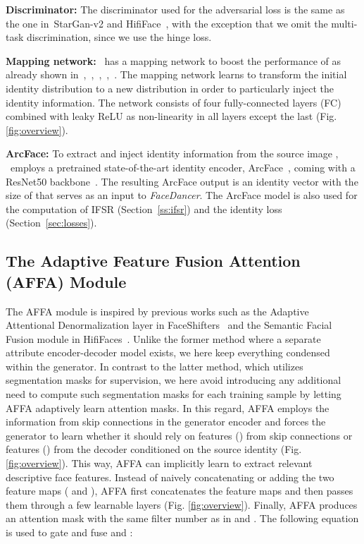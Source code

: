 \documentclass[10pt,twocolumn,letterpaper]{article}
\newcommand{\fti}[1]{\textit{FaceDancer}{#1}}
\begin{document}
\textbf{Discriminator:} The discriminator  used for the adversarial loss is the same as the one in~StarGan-v2 \cite{stargan} and HifiFace~\cite{hififace}, with the exception that we omit the multi-task discrimination, since we use the hinge loss.

\textbf{Mapping network:} \fti~has a mapping network  to boost the performance of  as already shown in~\cite{stylegan},~\cite{stylegan2},~\cite{stylegan3},~\cite{stargan},~\cite{styleganada}. The mapping network learns to transform the initial identity distribution to a new distribution in order to particularly  inject the identity information. The   network consists of four fully-connected layers (FC) combined with leaky ReLU as non-linearity in all layers except the last (Fig. \ref{fig:overview}).


\textbf{ArcFace:} To extract and inject identity information from the source image , \fti~employs a pretrained state-of-the-art identity encoder, ArcFace~\cite{arcface}, coming with  a ResNet50 backbone~\cite{resnet}. 
The resulting ArcFace output is an identity vector with the size of   that serves as an input to \fti.
The ArcFace model is also used for the computation of IFSR (Section~\ref{ss:ifsr}) and the identity loss (Section~\ref{sec:losses}). 




\subsection{The Adaptive Feature Fusion Attention (AFFA) Module}
The AFFA module is inspired by previous works such as the Adaptive Attentional Denormalization layer in FaceShifters~\cite{faceshifter}  and  the Semantic Facial Fusion module in HifiFaces~\cite{hififace}.
Unlike the former method where a separate attribute encoder-decoder model exists, we here keep everything condensed within the generator. In contrast to the latter method, which utilizes segmentation masks for supervision,  we here avoid introducing any additional need to compute such segmentation masks for each training sample by letting  AFFA adaptively learn attention masks.
In this regard, AFFA employs the information from skip connections in the generator encoder and forces the generator to learn whether it should rely on features () from  skip connections or features ()  from the decoder conditioned on the source identity (Fig. \ref{fig:overview}). This way, AFFA can implicitly learn to extract relevant descriptive face features.
Instead of naively concatenating or adding the two feature maps ( and ),  AFFA first concatenates the feature maps and then passes them through a few learnable layers (Fig. \ref{fig:overview}). 
Finally, AFFA produces an attention mask  with the same filter number as in  and . The following equation is used to gate and fuse   and :
\end{document}
